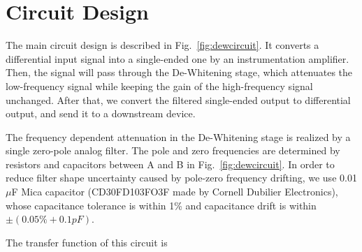 \section{Circuit Design}
The main circuit design is described in Fig.~\ref{fig:dewcircuit}. It converts a differential input signal into a single-ended one by an instrumentation amplifier. Then, the signal will pass through the De-Whitening stage, which attenuates the low-frequency signal while keeping the gain of the high-frequency signal unchanged. After that, we convert the filtered single-ended output to differential output, and send it to a downstream device.


The frequency dependent attenuation in the De-Whitening stage is realized by a single zero-pole analog filter. The pole and zero frequencies are determined by resistors and capacitors between A and B in Fig.~\ref{fig:dewcircuit}. In order to reduce filter shape uncertainty caused by pole-zero frequency drifting, we use 0.01$\mu$F Mica capacitor (CD30FD103FO3F made by Cornell Dubilier Electronics), whose capacitance tolerance is within 1\% and capacitance drift is within $\pm(0.05\% +0.1 pF)$.

The transfer function of this circuit is

